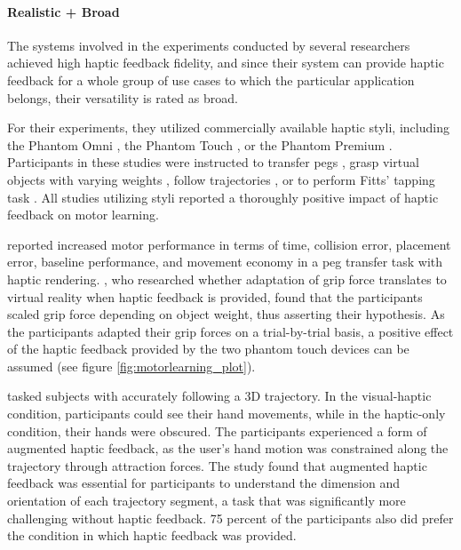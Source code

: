 \paragraph{Realistic + Broad} \label{sec:realisticbroad}
The systems involved in the experiments conducted by several researchers achieved high haptic feedback fidelity, and since their system can provide haptic feedback for a whole group of use cases to which the particular application belongs, their versatility is rated as broad.

For their experiments, they utilized commercially available haptic styli, including the Phantom Omni \cite{Brickler2019, Fehlberg2012}, the Phantom Touch \cite{Gunter2022}, or the Phantom Premium \cite{Rodriguez2010, Wall2000}. Participants in these studies were instructed to transfer pegs \cite{Brickler2019}, grasp virtual objects with varying weights \cite{Gunter2022}, follow trajectories \cite{Fehlberg2012, Rodriguez2010}, or to perform Fitts' tapping task \cite{Wall2000, Fitts1954TheMovement}. All studies utilizing styli reported a thoroughly positive impact of haptic feedback on motor learning.

\cite{Brickler2019} reported increased motor performance in terms of time, collision error, placement error, baseline performance, and movement economy in a peg transfer task with haptic rendering. \cite{Gunter2022}, who researched whether adaptation of grip force translates to virtual reality when haptic feedback is provided, found that the participants scaled grip force depending on object weight, thus asserting their hypothesis. As the participants adapted their grip forces on a trial-by-trial basis, a positive effect of the haptic feedback provided by the two phantom touch devices can be assumed (see figure \ref{fig:motorlearning_plot}). 

\cite{Rodriguez2010} tasked subjects with accurately following a 3D trajectory. In the visual-haptic condition, participants could see their hand movements, while in the haptic-only condition, their hands were obscured. The participants experienced a form of augmented haptic feedback, as the user's hand motion was constrained along the trajectory through attraction forces. The study found that augmented haptic feedback was essential for participants to understand the dimension and orientation of each trajectory segment, a task that was significantly more challenging without haptic feedback. 75 percent of the participants also did prefer the condition in which haptic feedback was provided. 

